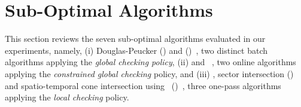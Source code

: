 \newtheorem{theorem}{Theorem}
\newtheorem{lemma}{Lemma}

\vspace{-1ex}
\section{Sub-Optimal Algorithms}
\label{sec-subopt}



This section reviews the seven sub-optimal \lsa algorithms evaluated in our experiments, namely,
(i) Douglas-Peucker (\dpa)\cite{Douglas:Peucker,Meratnia:Spatiotemporal} and \pavlidis (\tpa)~\cite{Pavlidis:Segment}, two distinct batch algorithms applying the \emph{global checking policy},
(ii) \bqsa\cite{Liu:BQS} and \squishe~\cite{Muckell:SQUISH}, two online algorithms applying the \emph{constrained global checking} policy, %
and (iii) \operb\cite{Lin:Operb}, sector intersection (\sia)~\cite{Williams:Longest,Sklansky:Cone,Dunham:Cone, Zhao:Sleeve} and spatio-temporal cone intersection using \sed~(\cia)~\cite{Lin:Cised}, three one-pass algorithms applying the \emph{local checking} policy.










